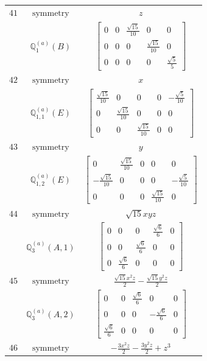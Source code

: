 \documentclass[fleqn,8pt,landscape]{jsarticle}
\begin{document}
\begin{longtable}{ccc}
$ 41 $ & $ \text{symmetry} $ & $ z $ \\
$  $ & $ \mathbb{Q}_{1}^{(a)}(B) $ & $ \begin{bmatrix} 0 & 0 & \frac{\sqrt{15}}{10} & 0 & 0 \\ 0 & 0 & 0 & \frac{\sqrt{15}}{10} & 0 \\ 0 & 0 & 0 & 0 & \frac{\sqrt{5}}{5} \end{bmatrix} $ \\ \hline
$ 42 $ & $ \text{symmetry} $ & $ x $ \\
$  $ & $ \mathbb{Q}_{1,1}^{(a)}(E) $ & $ \begin{bmatrix} \frac{\sqrt{15}}{10} & 0 & 0 & 0 & - \frac{\sqrt{5}}{10} \\ 0 & \frac{\sqrt{15}}{10} & 0 & 0 & 0 \\ 0 & 0 & \frac{\sqrt{15}}{10} & 0 & 0 \end{bmatrix} $ \\ \hline
$ 43 $ & $ \text{symmetry} $ & $ y $ \\
$  $ & $ \mathbb{Q}_{1,2}^{(a)}(E) $ & $ \begin{bmatrix} 0 & \frac{\sqrt{15}}{10} & 0 & 0 & 0 \\ - \frac{\sqrt{15}}{10} & 0 & 0 & 0 & - \frac{\sqrt{5}}{10} \\ 0 & 0 & 0 & \frac{\sqrt{15}}{10} & 0 \end{bmatrix} $ \\ \hline
$ 44 $ & $ \text{symmetry} $ & $ \sqrt{15} x y z $ \\
$  $ & $ \mathbb{Q}_{3}^{(a)}(A,1) $ & $ \begin{bmatrix} 0 & 0 & 0 & \frac{\sqrt{6}}{6} & 0 \\ 0 & 0 & \frac{\sqrt{6}}{6} & 0 & 0 \\ 0 & \frac{\sqrt{6}}{6} & 0 & 0 & 0 \end{bmatrix} $ \\ \hline
$ 45 $ & $ \text{symmetry} $ & $ \frac{\sqrt{15} x^{2} z}{2} - \frac{\sqrt{15} y^{2} z}{2} $ \\
$  $ & $ \mathbb{Q}_{3}^{(a)}(A,2) $ & $ \begin{bmatrix} 0 & 0 & \frac{\sqrt{6}}{6} & 0 & 0 \\ 0 & 0 & 0 & - \frac{\sqrt{6}}{6} & 0 \\ \frac{\sqrt{6}}{6} & 0 & 0 & 0 & 0 \end{bmatrix} $ \\ \hline
$ 46 $ & $ \text{symmetry} $ & $ - \frac{3 x^{2} z}{2} - \frac{3 y^{2} z}{2} + z^{3} $ \\

\end{longtable}
\end{document}
